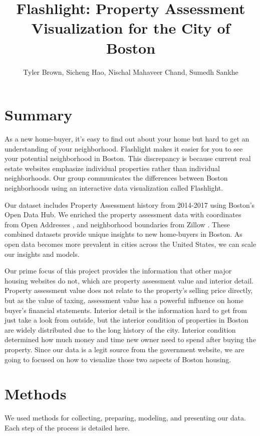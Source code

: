 \documentclass[12pt]{article}
\title{\textbf{Flashlight}: Property Assessment Visualization for the City of Boston}
\author{Tyler Brown, Sicheng Hao, Nischal Mahaveer Chand, Sumedh Sankhe}
\date{ }
\begin{document}
\maketitle

\section*{Summary}

As a new home-buyer, it's easy to find out about your home
but hard to get an understanding of your neighborhood. Flashlight
makes it easier for you to see your potential neighborhood in Boston.
This discrepancy is because current real estate websites emphasize
individual properties rather than individual neighborhoods. Our group
communicates the differences between Boston neighborhoods using an
interactive data visualization called Flashlight.

Our dataset includes Property Assessment history from 2014-2017
\cite{Property49:online} using Boston's Open Data Hub. We enriched the 
property assessment data with coordinates from Open Addresses
\cite{OpenAddr24:online}, and neighborhood boundaries from Zillow
\cite{ZillowNe81:online}. These combined datasets provide unique
insights to new home-buyers in Boston. As open data becomes more
prevalent in cities across the United States, we can scale our insights
and models.

Our prime focus of this project provides the information that other major housing websites do not, which are property assessment value and interior detail. Property assessment value does not relate to the property's selling price directly, but as the value of taxing, assessment value has a powerful influence on home buyer's financial statements. Interior detail is the information hard to get from just take a look from outside, but the interior condition of properties in Boston are widely distributed due to the long history of the city. Interior condition determined how much money and time new owner need to spend after buying the property. Since our data is a legit source from the government website, we are going to focused on how to visualize those two aspects of Boston housing. 



\section*{Methods}

We used methods for collecting, preparing, modeling, and presenting
our data. Each step of the process is detailed here.
\end{document}
